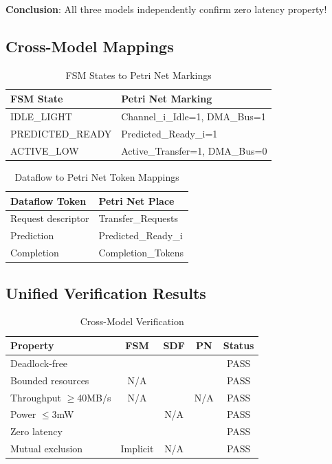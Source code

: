 \documentclass[conference]{IEEEtran}
\newcommand{\cmark}{\ding{51}}%
\begin{document}
\textbf{Conclusion}: All three models independently confirm zero latency property!

\subsection{Cross-Model Mappings}

\begin{table}[h]
\centering
\caption{FSM States to Petri Net Markings}
\label{tab:fsm_to_pn}
\begin{tabular}{ll}
\toprule
\textbf{FSM State} & \textbf{Petri Net Marking} \\
\midrule
IDLE\_LIGHT & Channel\_i\_Idle=1, DMA\_Bus=1 \\
PREDICTED\_READY & Predicted\_Ready\_i=1 \\
ACTIVE\_LOW & Active\_Transfer=1, DMA\_Bus=0 \\
\bottomrule
\end{tabular}
\end{table}

\begin{table}[h]
\centering
\caption{Dataflow to Petri Net Token Mappings}
\label{tab:df_to_pn}
\begin{tabular}{ll}
\toprule
\textbf{Dataflow Token} & \textbf{Petri Net Place} \\
\midrule
Request descriptor & Transfer\_Requests \\
Prediction & Predicted\_Ready\_i \\
Completion & Completion\_Tokens \\
\bottomrule
\end{tabular}
\end{table}

\subsection{Unified Verification Results}

\begin{table}[h]
\centering
\caption{Cross-Model Verification}
\label{tab:verification}
\begin{tabular}{lcccc}
\toprule
\textbf{Property} & \textbf{FSM} & \textbf{SDF} & \textbf{PN} & \textbf{Status} \\
\midrule
Deadlock-free & \cmark & \cmark & \cmark & PASS \\
Bounded resources & N/A & \cmark & \cmark & PASS \\
Throughput $\geq$40MB/s & N/A & \cmark & N/A & PASS \\
Power $\leq$3mW & \cmark & N/A & \cmark & PASS \\
Zero latency & \cmark & \cmark & \cmark & PASS \\
Mutual exclusion & Implicit & N/A & \cmark & PASS \\
\bottomrule
\end{tabular}
\end{table}
\end{document}
